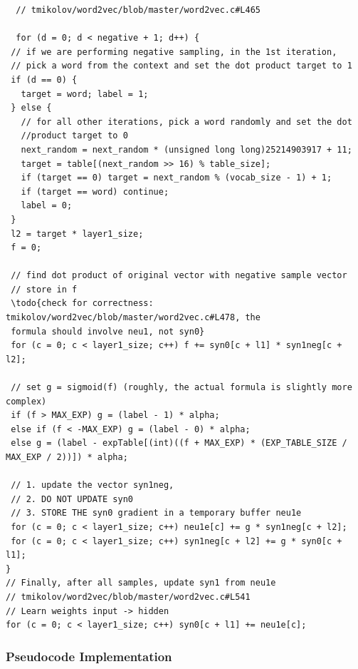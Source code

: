 \documentclass[11pt]{book}
\begin{document}
\begin{verbatim}
  // tmikolov/word2vec/blob/master/word2vec.c#L465

  for (d = 0; d < negative + 1; d++) {
 // if we are performing negative sampling, in the 1st iteration,
 // pick a word from the context and set the dot product target to 1
 if (d == 0) {
   target = word; label = 1;
 } else {
   // for all other iterations, pick a word randomly and set the dot
   //product target to 0
   next_random = next_random * (unsigned long long)25214903917 + 11;
   target = table[(next_random >> 16) % table_size];
   if (target == 0) target = next_random % (vocab_size - 1) + 1;
   if (target == word) continue;
   label = 0;
 }
 l2 = target * layer1_size;
 f = 0;

 // find dot product of original vector with negative sample vector
 // store in f
 \todo{check for correctness: tmikolov/word2vec/blob/master/word2vec.c#L478, the
 formula should involve neu1, not syn0}
 for (c = 0; c < layer1_size; c++) f += syn0[c + l1] * syn1neg[c + l2];

 // set g = sigmoid(f) (roughly, the actual formula is slightly more complex)
 if (f > MAX_EXP) g = (label - 1) * alpha;
 else if (f < -MAX_EXP) g = (label - 0) * alpha;
 else g = (label - expTable[(int)((f + MAX_EXP) * (EXP_TABLE_SIZE / MAX_EXP / 2))]) * alpha;

 // 1. update the vector syn1neg,
 // 2. DO NOT UPDATE syn0
 // 3. STORE THE syn0 gradient in a temporary buffer neu1e
 for (c = 0; c < layer1_size; c++) neu1e[c] += g * syn1neg[c + l2];
 for (c = 0; c < layer1_size; c++) syn1neg[c + l2] += g * syn0[c + l1];
}
// Finally, after all samples, update syn1 from neu1e
// tmikolov/word2vec/blob/master/word2vec.c#L541
// Learn weights input -> hidden
for (c = 0; c < layer1_size; c++) syn0[c + l1] += neu1e[c];
\end{verbatim}

\subsubsection{Pseudocode Implementation}
\end{document}
